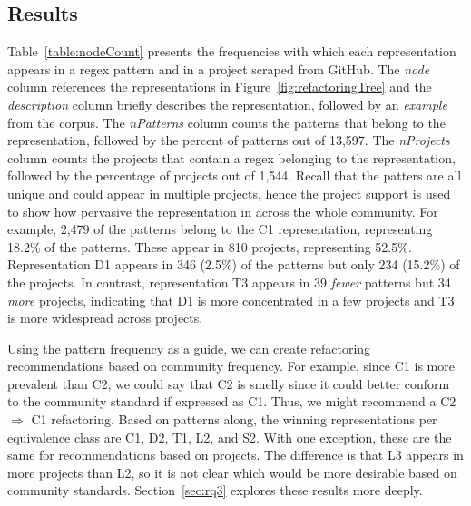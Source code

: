 \subsection{Results}
Table~\ref{table:nodeCount} presents the frequencies with which each representation appears in a regex pattern and in a project scraped from GitHub. The \emph{node} column references the representations in Figure~\ref{fig:refactoringTree} and the \emph{description} column briefly describes the representation, followed by an \emph{example} from the corpus. The \emph{nPatterns} column counts the patterns that belong to the representation, followed by the percent of patterns out of 13,597.
The \emph{nProjects} column counts the projects that contain a regex belonging to the representation, 
followed by the percentage of projects out of 1,544.  
Recall that the patters are all unique and could appear in multiple projects, hence the project support is used to show how pervasive the representation in across the whole community.
For example, 2,479 of the patterns belong to the C1 representation, representing 18.2\% of the patterns. These appear in 810 projects, representing 52.5\%. 
 Representation D1 appears in 346 (2.5\%) of the patterns but only 234 (15.2\%) of the projects. In contrast, representation T3 appears in 39 \emph{fewer} patterns but 34 \emph{more} projects, indicating that D1 is more concentrated in a few projects and T3 is more widespread across projects.

Using the pattern frequency as a guide, we can create refactoring recommendations based on community frequency. For example, since C1 is more prevalent than C2, we could say that C2 is smelly since it could better conform to the community standard if expressed as C1. Thus, we might recommend a C2 $\Rightarrow$ C1 refactoring. Based on patterns along, the winning representations per equivalence class are C1, D2, T1, L2, and S2. With one exception, these are the same for recommendations based on projects. The difference is that L3 appears in more projects than L2, so it is not clear which would be more desirable based on community standards. Section~\ref{sec:rq3} explores these results more deeply. 








